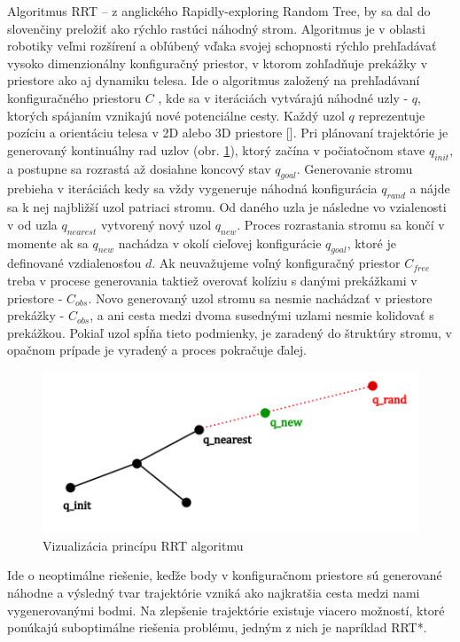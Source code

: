 Algoritmus RRT – z anglického Rapidly-exploring Random Tree, by sa dal do slovenčiny preložiť ako rýchlo rastúci náhodný strom. Algoritmus je v oblasti robotiky veľmi rozšírení a obľúbený vďaka svojej schopnosti rýchlo prehľadávať vysoko dimenzionálny konfiguračný priestor, v ktorom zohľadňuje prekážky v priestore ako aj dynamiku telesa. \newline
Ide o algoritmus založený na prehľadávaní konfiguračného priestoru $C$ , kde sa v iteráciách vytvárajú náhodné uzly - $q$, ktorých spájaním vznikajú nové potenciálne cesty. Každý uzol $q$ reprezentuje pozíciu a orientáciu telesa v 2D alebo 3D priestore []. Pri plánovaní trajektórie je generovaný kontinuálny rad uzlov (obr. \ref{OBRAZOK 1.2.1}), ktorý začína v počiatočnom stave $q_{init}$,  a postupne sa rozrastá až dosiahne koncový stav $q_{goal}$.  Generovanie stromu prebieha v iteráciách kedy sa vždy vygeneruje náhodná konfigurácia $q_{rand}$ a nájde sa k nej najbližší uzol patriaci stromu. Od daného uzla je následne vo vzialenosti v od uzla $q_{nearest}$ vytvorený nový uzol $q_{new}$. Proces rozrastania stromu sa končí v momente ak sa $q_{new}$  nachádza v okolí cieľovej konfigurácie $q_{goal}$, ktoré je definované vzdialenosťou $d$. Ak neuvažujeme voľný konfiguračný priestor $C_{free}$ treba v procese generovania taktiež overovať kolíziu s danými prekážkami v priestore - $C_{obs}$. Novo generovaný uzol stromu sa nesmie nachádzať v priestore prekážky - $C_{obs}$, a ani cesta medzi dvoma susednými uzlami nesmie kolidovať s prekážkou. Pokiaľ uzol spĺňa tieto podmienky, je zaradený do štruktúry stromu, v opačnom prípade je vyradený a proces pokračuje ďalej.

\begin{figure}[h]
	\centering
	\includegraphics[width=120mm]{img/RRT1.png}
	\caption{Vizualizácia princípu RRT algoritmu }\label{OBRAZOK 1.2.1} 
\end{figure}  

Ide o neoptimálne riešenie, keďže body v konfiguračnom priestore sú generované náhodne a výsledný tvar trajektórie vzniká ako najkratšia cesta medzi nami vygenerovanými bodmi. Na zlepšenie trajektórie existuje viacero možností, ktoré ponúkajú suboptimálne riešenia problému, jedným z nich je napríklad RRT*.  

